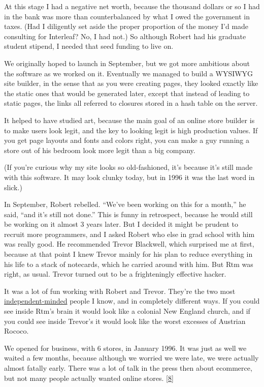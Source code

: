 At this stage I had a negative net worth, because the thousand dollars
or so I had in the bank was more than counterbalanced by what I owed the
government in taxes. (Had I diligently set aside the proper proportion
of the money I'd made consulting for Interleaf? No, I had not.) So
although Robert had his graduate student stipend, I needed that seed
funding to live on.

We originally hoped to launch in September, but we got more ambitious
about the software as we worked on it. Eventually we managed to build a
WYSIWYG site builder, in the sense that as you were creating pages, they
looked exactly like the static ones that would be generated later,
except that instead of leading to static pages, the links all referred
to closures stored in a hash table on the server.

It helped to have studied art, because the main goal of an online store
builder is to make users look legit, and the key to looking legit is
high production values. If you get page layouts and fonts and colors
right, you can make a guy running a store out of his bedroom look more
legit than a big company.

(If you're curious why my site looks so old-fashioned, it's because it's
still made with this software. It may look clunky today, but in 1996 it
was the last word in slick.)

In September, Robert rebelled. ``We've been working on this for a
month,'' he said, ``and it's still not done.'' This is funny in
retrospect, because he would still be working on it almost 3 years
later. But I decided it might be prudent to recruit more programmers,
and I asked Robert who else in grad school with him was really good. He
recommended Trevor Blackwell, which surprised me at first, because at
that point I knew Trevor mainly for his plan to reduce everything in his
life to a stack of notecards, which he carried around with him. But Rtm
was right, as usual. Trevor turned out to be a frighteningly effective
hacker.

It was a lot of fun working with Robert and Trevor. They're the two most
\href{think.html}{independent-minded} people I know, and in completely
different ways. If you could see inside Rtm's brain it would look like a
colonial New England church, and if you could see inside Trevor's it
would look like the worst excesses of Austrian Rococo.

We opened for business, with 6 stores, in January 1996. It was just as
well we waited a few months, because although we worried we were late,
we were actually almost fatally early. There was a lot of talk in the
press then about ecommerce, but not many people actually wanted online
stores. {[}\hyperref[f8n]{8}{]}

